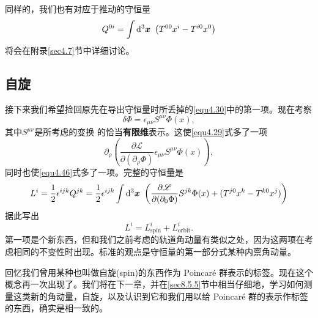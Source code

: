 同样的，我们也有对应于推动的守恒量
\begin{equation}
Q^{0i}=\int \mathrm d^3 \boldsymbol{x}~ \left(T^{0 0}x^i - T^{i 0}x^0\right)
\label{equ4.47}
\end{equation}
将会在附录\ref{sec4.7}节中详细讨论。

\subsection{自旋}\label{sec4.5.4}
接下来我们希望捡回原先在导出守恒量时所丢掉的\eqref{equ4.30}中的第一项。现在考察
\begin{equation}
\label{equ4.48}
\delta\Phi = \epsilon_{\mu\nu} S^{\mu\nu}\Phi(x),
\end{equation}
其中$S^{\mu\nu}$是所考虑的变换%
%
的恰当{\bfseries 有限维}表示。这使\eqref{equ4.29}式多了一项
\begin{equation}
\label{equ4.49}
\partial_\rho \left(\frac{\partial\mathscr L}{\partial (\partial_\rho \Phi)}\epsilon_{\mu\nu}S^{\mu\nu}\Phi(x)\right),
\end{equation}
同时也使\eqref{equ4.46}式多了一项。完整的守恒量是
\begin{equation}
\label{equ4.50}
L^i = \frac{1}{2}\epsilon^{ijk}Q^{jk} = \frac{1}{2}\epsilon^{ijk} \int \mathrm d^3 \boldsymbol{x}~ \left(\frac{\partial\mathscr L}{\partial (\partial_0 \Phi)}S^{jk}\Phi(x) + (T^{j 0}x^k - T^{k 0} x^j)\right)
\end{equation}
据此写出
\begin{equation}
\label{equ4.51}
L^i = L_\text{spin}^i + L_\text{orbit}^i .
\end{equation}
第一项是个新东西，但和我们之前考虑的轨道角动量有类似之处，因为这两项在考虑相同的不变性时出现。标准的观点是守恒量的第一部分式某种内禀角动量。%

回忆我们曾用某种也叫做自旋(spin)的东西作为 Poincar\'e 群表示的标签。现在这个概念再一次出现了。我们将在下一章，并在\ref{sec8.5.5}节中相当仔细地，学习如何测量这类新的角动量，自旋，以及认识到它和我们用以给 Poincar\'e 群的表示作标签的东西，确实是相一致的。

